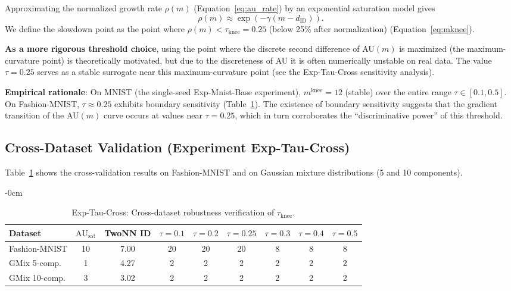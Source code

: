 \documentclass[make,article,submit,pdftex,moreauthors]{Definitions/mdpi}
\newcommand{\dID}{d_{\mathrm{ID}}}
\newcommand{\AUsat}{\mathrm{AU}_{\mathrm{sat}}}
\newcommand{\mknee}{m^{\mathrm{knee}}}
\begin{document}
Approximating the normalized growth rate $\rho(m)$
(Equation~\eqref{eq:au_rate}) by an exponential saturation model gives
\begin{equation}
  \rho(m) \approx \exp(-\gamma (m - \dID)).
  \label{eq:knee_curvature}
\end{equation}
We define the slowdown point as the point where
$\rho(m) < \tau_{\mathrm{knee}} = 0.25$ (below 25\% after normalization)
(Equation~\eqref{eq:mknee}).

\textbf{As a more rigorous threshold choice}, using the point where the discrete
second difference of AU$(m)$ is maximized (the maximum-curvature point) is
theoretically motivated, but due to the discreteness of AU it is often
numerically unstable on real data.
The value $\tau = 0.25$ serves as a stable surrogate near this maximum-curvature
point (see the Exp-Tau-Cross sensitivity analysis).

\textbf{Empirical rationale}:
On MNIST (the single-seed Exp-Mnist-Base experiment), $\mknee = 12$ (stable) over
the entire range $\tau \in [0.1, 0.5]$.
On Fashion-MNIST, $\tau \approx 0.25$ exhibits boundary sensitivity
(Table~\ref{tab:ez}).
The existence of boundary sensitivity suggests that the gradient transition of
the AU$(m)$ curve occurs at values near $\tau = 0.25$, which in turn corroborates
the ``discriminative power'' of this threshold.

\subsection*{Cross-Dataset Validation (Experiment Exp-Tau-Cross)}

Table~\ref{tab:ez} shows the cross-validation results on Fashion-MNIST and on
Gaussian mixture distributions (5 and 10 components).

\begin{table}[H]
\begin{adjustwidth}{-\extralength}{0cm}
\centering
\caption{Exp-Tau-Cross: Cross-dataset robustness verification of $\tau_{\mathrm{knee}}$.}
\label{tab:ez}
\small
\begin{tabular}{lcc|cccccc}
\toprule
Dataset & $\AUsat$ & TwoNN ID & $\tau=0.1$ & $\tau=0.2$ & $\tau=0.25$ & $\tau=0.3$ & $\tau=0.4$ & $\tau=0.5$ \\
\midrule
Fashion-MNIST & 10 & 7.00 & 20 & 20 & 20 & 8 & 8 & 8 \\
GMix 5-comp. & 1 & 4.27 & 2 & 2 & 2 & 2 & 2 & 2 \\
GMix 10-comp. & 3 & 3.02 & 2 & 2 & 2 & 2 & 2 & 2 \\
\bottomrule
\end{tabular}
\end{adjustwidth}
\end{table}
\end{document}
